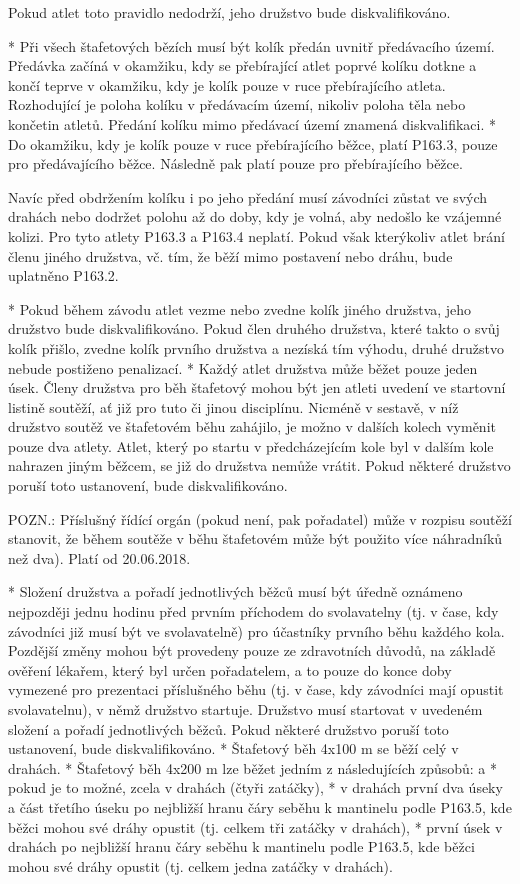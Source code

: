 Pokud atlet toto pravidlo nedodrží, jeho družstvo bude diskvalifikováno.

* Při všech štafetových bězích musí být kolík předán uvnitř předávacího území. Předávka začíná v okamžiku, kdy se přebírající atlet poprvé kolíku dotkne a končí teprve v okamžiku, kdy je kolík pouze v ruce přebírajícího atleta. Rozhodující je poloha kolíku v předávacím území, nikoliv poloha těla nebo končetin atletů. Předání kolíku mimo předávací území znamená diskvalifikaci.
* Do okamžiku, kdy je kolík pouze v ruce přebírajícího běžce, platí P163.3, pouze pro předávajícího běžce. Následně pak platí pouze pro přebírajícího běžce.

Navíc před obdržením kolíku i po jeho předání musí závodníci zůstat ve svých drahách nebo dodržet polohu až do doby, kdy je volná, aby nedošlo ke vzájemné kolizi. Pro tyto atlety P163.3 a P163.4 neplatí. Pokud však kterýkoliv atlet brání členu jiného družstva, vč. tím, že běží mimo postavení nebo dráhu, bude uplatněno P163.2.

* Pokud během závodu atlet vezme nebo zvedne kolík jiného družstva, jeho družstvo bude diskvalifikováno. Pokud člen druhého družstva, které takto o svůj kolík přišlo, zvedne kolík prvního družstva a nezíská tím výhodu, druhé družstvo nebude postiženo penalizací.
* Každý atlet družstva může běžet pouze jeden úsek. Členy družstva pro běh štafetový mohou být jen atleti uvedení ve startovní listině soutěží, ať již pro tuto či jinou disciplínu. Nicméně v sestavě, v níž družstvo soutěž ve štafetovém běhu zahájilo, je možno v dalších kolech vyměnit pouze dva atlety. Atlet, který po startu v předcházejícím kole byl v dalším kole nahrazen jiným běžcem, se již do družstva nemůže vrátit. Pokud některé družstvo poruší toto ustanovení, bude diskvalifikováno.

POZN.: Příslušný řídící orgán (pokud není, pak pořadatel) může v rozpisu soutěží stanovit, že během soutěže v běhu štafetovém může být použito více náhradníků než dva). Platí od 20.06.2018.

* Složení družstva a pořadí jednotlivých běžců musí být úředně oznámeno nejpozději jednu hodinu před prvním příchodem do svolavatelny (tj. v čase, kdy závodníci již musí být ve svolavatelně) pro účastníky prvního běhu každého kola. Pozdější změny mohou být provedeny pouze ze zdravotních důvodů, na základě ověření lékařem, který byl určen pořadatelem, a to pouze do konce doby vymezené pro prezentaci příslušného běhu (tj. v čase, kdy závodníci mají opustit svolavatelnu), v němž družstvo startuje. Družstvo musí startovat v uvedeném složení a pořadí jednotlivých běžců. Pokud některé družstvo poruší toto ustanovení, bude diskvalifikováno.
* Štafetový běh 4x100 m se běží celý v drahách.
* Štafetový běh 4x200 m lze běžet jedním z následujících způsobů:
  \begitems \style a
  * pokud je to možné, zcela v drahách (čtyři zatáčky),
  * v drahách první dva úseky a část třetího úseku po nejbližší hranu čáry seběhu k mantinelu podle P163.5, kde běžci mohou své dráhy opustit (tj. celkem tři zatáčky v drahách),
  * první úsek v drahách po nejbližší hranu čáry seběhu k mantinelu podle P163.5, kde běžci mohou své dráhy opustit (tj. celkem jedna zatáčky v drahách).
  \enditems

